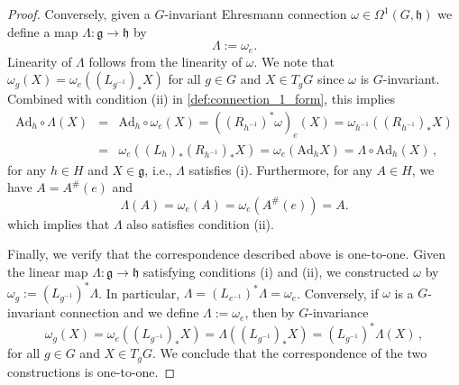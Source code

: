 \documentclass[12pt,a4paper]{article}
\numberwithin{equation}{section}
\theoremstyle{plain}
\theoremstyle{definition}
\theoremstyle{remark}
\begin{document}
\begin{proof}
    Conversely, given a $G$-invariant Ehresmann connection $\omega \in \Omega^1(G,\mathfrak{h})$ we define a map $\Lambda:\mathfrak{g}\to \mathfrak{h}$ by
    \begin{equation}
        \Lambda:=\omega_e.
    \end{equation}
    Linearity of $\Lambda$ follows from the linearity of $\omega$. We note that $\omega_g(X) = \omega_e((L_{g^{-1}})_*X)$ for all $g\in G$ and $X\in T_gG$ since $\omega$ is $G$-invariant. Combined with condition (ii) in \cref{def:connection_1_form}, this implies
    \begin{eqnarray*}
        \mathrm{Ad}_h\circ\Lambda(X) &=& \mathrm{Ad}_h\circ\omega_e(X) = ((R_{h^{-1}})^*\omega)_e(X) = \omega_{h^{-1}}((R_{h^{-1}})_*X)\\
        &=& \omega_{e}((L_h)_*(R_{h^{-1}})_*X) = \omega_{e}(\mathrm{Ad}_hX) = \Lambda\circ\mathrm{Ad}_h(X) \,,
    \end{eqnarray*}
    for any $h\in H$ and $X\in\mathfrak{g}$, i.e., $\Lambda$ satisfies (i). Furthermore, for any $A \in H$, we have $A=A^\#(e)$ and
    \begin{equation}
        \Lambda(A)=\omega_e(A)=\omega_e(A^\#(e))=A.
    \end{equation}
    which implies that $\Lambda$ also satisfies condition (ii).

    Finally, we verify that the correspondence described above is one-to-one. Given the linear map $\Lambda:\mathfrak{g}\to\mathfrak{h}$ satisfying conditions (i) and (ii), we constructed $\omega$ by $\omega_g:=(L_{g^{-1}})^*\Lambda$. In particular, $\Lambda=(L_{e^{-1}})^*\Lambda=\omega_e$. Conversely, if $\omega$ is a $G$-invariant connection and we define $\Lambda:=\omega_e$, then by $G$-invariance
    \begin{equation}
        \omega_g(X) = \omega_e((L_{g^{-1}})_*X) = \Lambda((L_{g^{-1}})_*X) = (L_{g^{-1}})^*\Lambda(X) \,,
    \end{equation}
    for all $g\in G$ and $X\in T_gG$. We conclude that the correspondence of the two constructions is one-to-one.
\end{proof}
\end{document}
